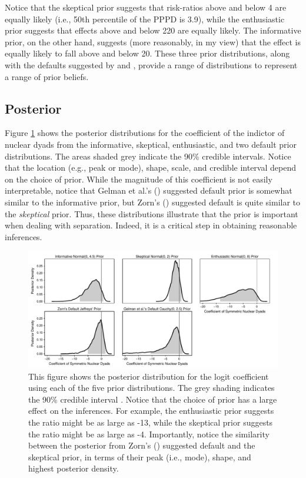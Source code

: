\documentclass[12pt]{article}
\begin{document}


Notice that the skeptical prior suggests that risk-ratios above and below 4 are equally likely (i.e., 50th percentile of the PPPD is 3.9), while the enthusiastic prior suggests that effects above and below 220 are equally likely. The informative prior, on the other hand, suggests (more reasonably, in my view) that the effect is equally likely to fall above and below 20. These three prior distributions, along with the defaults suggested by \cite{Zorn2005} and \cite{Gelmanetal2008}, provide a range of distributions to represent a range of prior beliefs.

\subsection*{Posterior}

Figure \ref{fig:bm-posterior-density} shows the posterior distributions for the coefficient of the indictor of nuclear dyads from the informative, skeptical, enthusiastic, and two default prior distributions. The areas shaded grey indicate the 90\% credible intervals. Notice that the location (e.g., peak or mode), shape, scale, and credible interval depend on the choice of prior. While the magnitude of this coefficient is not easily interpretable, notice that Gelman et al.'s (\citeyear{Gelmanetal2008}) suggested default prior is somewhat similar to the informative prior, but Zorn's (\citeyear{Zorn2005}) suggested default is quite similar to the \emph{skeptical} prior. Thus, these distributions illustrate that the prior is important when dealing with separation. Indeed, it is a critical step in obtaining reasonable inferences.

\begin{figure}[H]
\begin{center}
\includegraphics[scale = .8]{figs/bm-posterior-density.pdf}
\caption{This figure shows the posterior distribution for the logit coefficient using each of the five prior distributions.  The grey shading indicates the 90\% credible interval . Notice that the choice of prior has a large effect on the inferences. For example, the enthusiastic prior suggests the ratio might be as large as -13, while the skeptical prior suggests the ratio might be as large as -4. Importantly, notice the similarity between the posterior from Zorn's (\citeyear{Zorn2005}) suggested default and the skeptical prior, in terms of their peak (i.e., mode), shape, and highest posterior density.}\label{fig:bm-posterior-density}
\end{center}
\end{figure}
\end{document}
